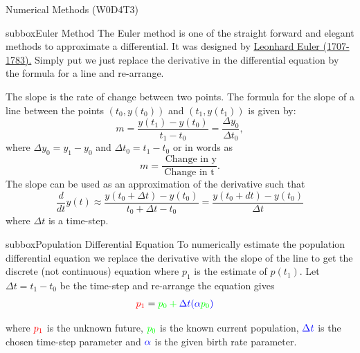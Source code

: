 \begin{textbox}{Numerical Methods (W0D4T3) }
\begin{subbox}{subbox}{Euler Method}
\scriptsize
The Euler method is one of the straight forward and elegant methods to approximate a differential. It was designed by \href{https://en.wikipedia.org/wiki/Leonhard_Euler}{Leonhard Euler (1707-1783).} 
Simply put we just replace the derivative in the differential equation by the formula for a line and re-arrange.

The slope is the rate of change between two points. The formula for the slope of a line between the points $(t_0,y(t_0))$ and $(t_1,y(t_1))$ is given by:
$$ m=\frac{y(t_1)-y(t_0)}{t_1-t_0}=\frac{\Delta y_0}{\Delta t_0}, $$
where $\Delta y_0=y_1-y_0$ and $\Delta t_0=t_1-t_0$ or in words as
$$ m=\frac{\text{ Change in y} }{\text{Change in t}}. $$
The slope can be used as an approximation of the derivative such that
$$ \frac{d}{dt}y(t)\approx \frac{y(t_0+\Delta t)-y(t_0)}{t_0+\Delta t-t_0}=\frac{y(t_0+dt)-y(t_0)}{\Delta t}$$
where $\Delta t$ is a time-step.
\end{subbox}
\begin{subbox}{subbox}{Population Differential Equation}
\scriptsize
To numerically estimate the population differential equation we replace the derivative with the slope of the line to get the discrete (not continuous) equation where $p_1$ is the estimate of $p(t_1)$. Let $\Delta t=t_1-t_0$ be the time-step and re-arrange the equation gives
\begin{align*}
\color{red}{p_1}&=\color{green}{p_0}+\color{blue}{\Delta t} (\color{blue}{\alpha} \color{green}{p_0} \color{blue}{)}
\end{align*}

where $\color{red}{p_1}$ is the unknown future, $\color{green}{p_0}$ is the known current population, $\color{blue}{\Delta t}$ is the chosen time-step parameter and $\color{blue}{\alpha}$ is the given birth rate parameter.


\end{subbox}
\end{textbox}
